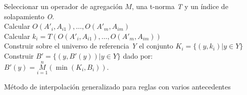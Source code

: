 \begin{algorithm}
\DontPrintSemicolon
{}
\vspace{0.4 cm}
Seleccionar un operador de agregación $M$, una t-norma \emph{T} y un índice de solapamiento \emph{O}.\\
 {
Calcular $O(A'_{i}, A_{i1}),\ldots,O(A'_{m}, A_{im})$\\
Calcular $k_{i} = T(O(A'_{i}, A_{i1}),\ldots,O(A'_{m}, A_{im}))$\\
Construir sobre el universo de referencia \emph{Y} el conjunto $K_{i} = \{(y,k_{i})|y \in Y\}$
}
Construir $B' = \{(y, B'(y))|y \in Y\}$ dado por: \\
\centering
\nonl $B'(y) = \overset{n}{\underset{i=1}{M}}(\min(K_{i},B_{i}))$.\\
\;
\caption{Método de interpolación generalizado para reglas con varios antecedentes}
\label{algo:multi-overlap-interpolation-method}
\end{algorithm}

